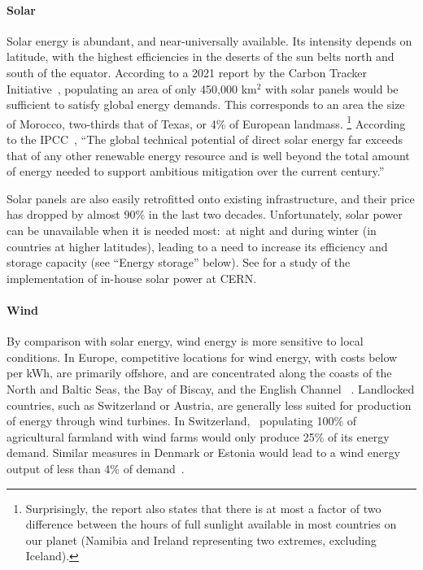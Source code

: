 \documentclass[../SustainableHEP.tex]{subfiles}
\begin{document}
\paragraph{Solar}

Solar energy is abundant, and near-universally available.  Its intensity depends on latitude, with the highest efficiencies in the deserts of the sun belts north and south of the equator. According to a 2021 report by the Carbon Tracker Initiative~\cite{CarbonTracker21}, populating an area of only 450,000 km$^2$ with solar panels would be sufficient to satisfy global energy demands.  This corresponds to an area the size of Morocco, two-thirds that of Texas, or 4\% of European landmass. \footnote{Surprisingly, the report also states that there is at most a factor of two difference between the hours of full sunlight available in most countries on our planet (Namibia and Ireland representing two extremes, excluding Iceland).}  According to the IPCC~\cite{IPCCMitigationReport}, ``The global technical potential of direct solar energy far exceeds that of any other renewable energy resource and is well beyond the total amount of energy needed to support ambitious mitigation over the current century.''

Solar panels are also easily retrofitted onto existing infrastructure, and their price has dropped by almost 90\% in the last two decades.  Unfortunately, solar power can be unavailable when it is needed most:\ at night and during winter (in countries at higher latitudes), leading to a need to increase its efficiency and storage capacity (see ``Energy storage'' below). See  for a study of the implementation of in-house solar power at CERN.

\paragraph{Wind}

By comparison with solar energy, wind energy is more sensitive to local conditions. In Europe, competitive locations for wind energy, with costs below  per kWh, are primarily offshore, and are concentrated along the coasts of the North and Baltic Seas, the Bay of Biscay, and the English Channel
~\cite{EEAWindEnergy}.
Landlocked countries, such as Switzerland or Austria, are generally less suited for production of energy through wind turbines. In Switzerland, \eg\ populating 100\% of agricultural farmland with wind farms would only produce 25\% of its energy demand.  Similar measures in Denmark or Estonia would lead to a wind energy output of less than 4\% of demand~\cite{EEAWindEnergy}. 
\end{document}
